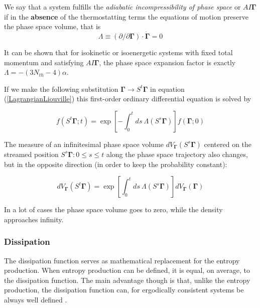 \documentclass[a4paper,12pt]{article}
\begin{document}
We say that a system fulfills the \textit{adiabatic incompressibility of phase space} or $AI\bm{\Gamma}$ if in the \textbf{absence} of the thermostatting terms the equations of motion preserve the phase space volume, that is
\begin{equation}
  \Lambda \equiv (\partial / \partial\bm{\Gamma}) \cdot \dot{\bm{\Gamma}}=0
\end{equation}


It can be shown\cite{Evans:2241458} that for isokinetic or isoenergetic systems with fixed total momentum and satisfying $AI\bm{\Gamma}$, the phase space expansion factor is exactly $\Lambda = - (3N_{th} -4) \alpha $.
\noindent\makebox[\linewidth]{\rule{\textwidth}{1pt}} 

If we make the following substitution $\bm{\Gamma} \to S^t\bm{\Gamma}$ in equation (\ref{LagrangianLiouville}) this first-order ordinary differential equation is solved by

\begin{equation}
\label{distributionStreaming}
  f(S^t\bm{\Gamma};t)=\exp[-\int_0^t ds\ \Lambda(S^s\bm{\Gamma})]f(\bm{\Gamma};0)
\end{equation}

The measure of an infinitesimal phase space volume $dV_{\bm{\Gamma}}(S^s \bm{\Gamma})$ centered on the streamed position $S^s\bm{\Gamma} : 0 \leq s \leq t $ along the phase space trajectory also changes, but in the opposite direction (in order to keep the probability constant):

\begin{equation}
\label{PhaseVolumeExpansion}
  dV_{\bm{\Gamma}}(S^t \bm{\Gamma}) =\exp[\int_0^t ds\ \Lambda(S^s\bm{\Gamma})]dV_{\bm{\Gamma}}(\bm{\Gamma})
\end{equation}
 
In a lot of cases the phase space volume goes to zero, while the density approaches infinity\cite{Evans:2241458}.


\subsubsection{Dissipation}

The dissipation function serves as mathematical replacement for the entropy production. When entropy production can be defined, it is equal, on average, to the dissipation function. The main advantage though is that, unlike the entropy production, the dissipation function can, for ergodically consistent systems be always well defined \cite{Evans:2241458}.
\end{document}
